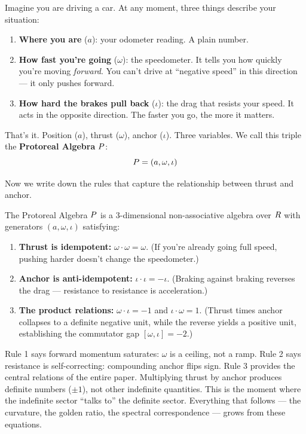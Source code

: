 Imagine you are driving a car. At any moment, three things describe your situation:
\begin{enumerate}
\item \textbf{Where you are} ($a$): your odometer reading. A plain number.
\item \textbf{How fast you're going} ($\omega$): the speedometer. It tells you how quickly you're moving \emph{forward}. You can't drive at ``negative speed'' in this direction --- it only pushes forward.
\item \textbf{How hard the brakes pull back} ($\iota$): the drag that resists your speed. It acts in the opposite direction. The faster you go, the more it matters.
\end{enumerate}

That's it. Position ($a$), thrust ($\omega$), anchor ($\iota$). Three variables. We call this triple the \textbf{Protoreal Algebra} $P$:
$$P = (a, \omega, \iota)$$

Now we write down the rules that capture the relationship between thrust and anchor.

\begin{definition}\label{def:protoreal}
The Protoreal Algebra $P$ is a 3-dimensional non-associative algebra over $R$ with generators $(a, \omega, \iota)$ satisfying:
\begin{enumerate}
\item \textbf{Thrust is idempotent:} $\omega \cdot \omega = \omega$. (If you're already going full speed, pushing harder doesn't change the speedometer.)
\item \textbf{Anchor is anti-idempotent:} $\iota \cdot \iota = -\iota$. (Braking against braking reverses the drag --- resistance to resistance is acceleration.)
\item \textbf{The product relations:} $\omega \cdot \iota = -1$ and $\iota \cdot \omega = 1$. (Thrust times anchor collapses to a definite negative unit, while the reverse yields a positive unit, establishing the commutator gap $[\omega, \iota] = -2$.)
\end{enumerate}
\end{definition}

\begin{remark}
Rule 1 says forward momentum saturates: $\omega$ is a ceiling, not a ramp. Rule 2 says resistance is self-correcting: compounding anchor flips sign. Rule 3 provides the central relations of the entire paper. Multiplying thrust by anchor produces definite numbers ($\pm 1$), not other indefinite quantities. This is the moment where the indefinite sector ``talks to'' the definite sector. Everything that follows --- the curvature, the golden ratio, the spectral correspondence --- grows from these equations.
\end{remark}


